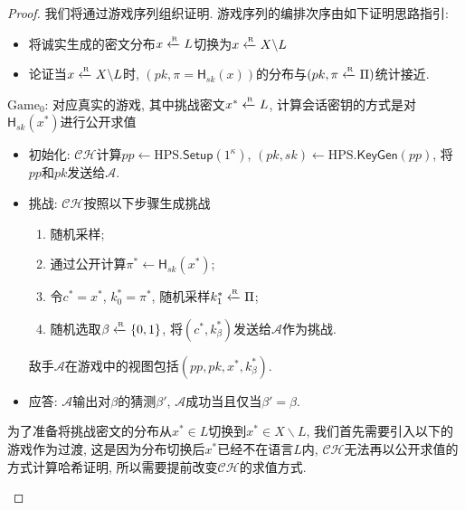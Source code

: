 \begin{proof}
我们将通过游戏序列组织证明. 游戏序列的编排次序由如下证明思路指引:  
\begin{itemize}
    \item 将诚实生成的密文分布$x \xleftarrow{\textup{\tiny R}} L$切换为$x \xleftarrow{\textup{\tiny R}} X \backslash L$
    \item 论证当$x \xleftarrow{\textup{\tiny R}} X \backslash L$时, $(pk, \pi = \mathsf{H}_{sk}(x))$的分布与$(pk, \pi \xleftarrow{\textup{\tiny R}} \Pi)$统计接近. 
\end{itemize} 

\begin{trivlist}
\item $\text{Game}_0$: 对应真实的游戏, 其中挑战密文$x^* \xleftarrow{\textup{\tiny R}} L$, 计算会话密钥的方式是对$\mathsf{H}_{sk}(x^*)$进行公开求值
\begin{itemize}
    \item 初始化: $\mathcal{CH}$计算$pp \leftarrow \text{HPS}.\mathsf{Setup}(1^\kappa)$, 
        $(pk, sk) \leftarrow \text{HPS}.\mathsf{KeyGen}(pp)$, 将$pp$和$pk$发送给$\mathcal{A}$. 
    \item 挑战: $\mathcal{CH}$按照以下步骤生成挑战 
        \begin{enumerate}
            \item 随机采样;  
            \item 通过公开计算$\pi^* \leftarrow \mathsf{H}_{sk}(x^*)$; 
            \item 令$c^* = x^*$, $k_0^* = \pi^*$, 随机采样$k_1^* \xleftarrow{\textup{\tiny R}} \Pi$; 
            \item 随机选取$\beta \xleftarrow{\textup{\tiny R}} \{0,1\}$, 将$(c^*, k_\beta^*)$发送给$\mathcal{A}$作为挑战. 
        \end{enumerate}
        敌手$\mathcal{A}$在游戏中的视图包括$(pp, pk, x^*, k_\beta^*)$. 
    \item 应答: $\mathcal{A}$输出对$\beta$的猜测$\beta'$, $\mathcal{A}$成功当且仅当$\beta' = \beta$.
\end{itemize}
为了准备将挑战密文的分布从$x^* \in L$切换到$x^* \in X \backslash L$, 我们首先需要引入以下的游戏作为过渡, 这是因为分布切换后$x^*$已经不在语言$L$内, 
$\mathcal{CH}$无法再以公开求值的方式计算哈希证明, 所以需要提前改变$\mathcal{CH}$的求值方式. 


\end{trivlist}
\end{proof}
